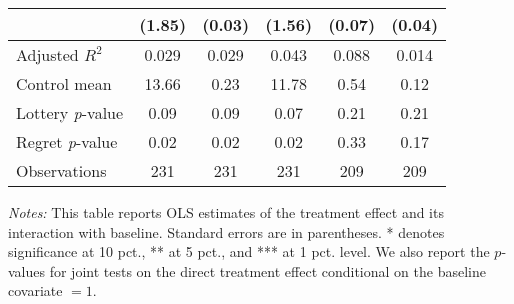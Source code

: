\begin{table}[h]
{\begin{threeparttable}
\begin{tabular}{l*{5}{c}}
                &   (1.85)         &   (0.03)         &   (1.56)         &   (0.07)         &   (0.04)         \\
\midrule
Adjusted \(R^{2}\)&    0.029         &    0.029         &    0.043         &    0.088         &    0.014         \\
Control mean    &    13.66         &     0.23         &    11.78         &     0.54         &     0.12         \\
Lottery \emph{p}-value&     0.09         &     0.09         &     0.07         &     0.21         &     0.21         \\
Regret \emph{p}-value&     0.02         &     0.02         &     0.02         &     0.33         &     0.17         \\
Observations    &      231         &      231         &      231         &      209         &      209         \\
\bottomrule \end{tabular} \begin{tablenotes}[flushleft] \footnotesize \item \emph{Notes:} This table reports OLS estimates of the treatment effect and its interaction with baseline. Standard errors are in parentheses. * denotes significance at 10 pct., ** at 5 pct., and *** at 1 pct. level. We also report the \(p\)-values for joint tests on the direct treatment effect conditional on the baseline covariate $= 1$. \end{tablenotes} \end{threeparttable} } \end{table}

